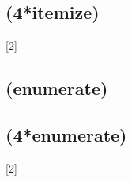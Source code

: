 \subsection{\blindtext@listEx (4*itemize)}%
{}[2]%
\subsection{\blindtext@listEx (enumerate)}%
\Blindenumerate[3]
\subsection{\blindtext@listEx (4*enumerate)}%
{}[2]%
\makeatother



